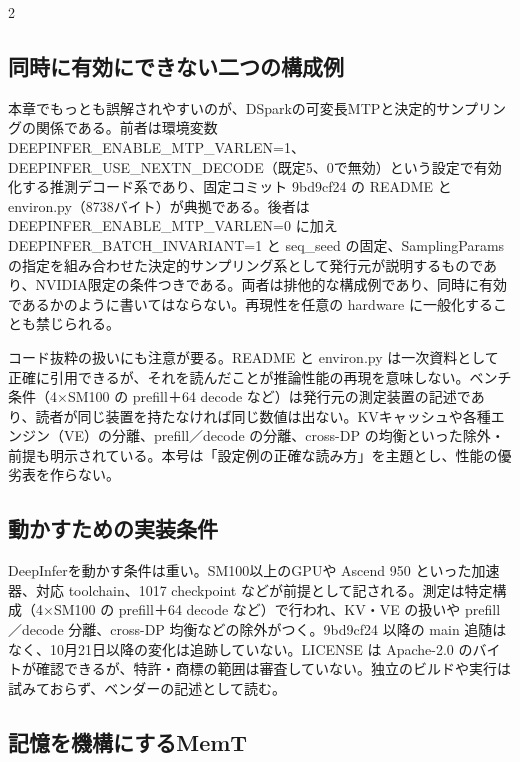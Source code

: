 \documentclass[lualatex,a4paper,10pt]{jlreq}
\begin{document}
\begin{multicols}{2} %


\subsection*{同時に有効にできない二つの構成例}


本章でもっとも誤解されやすいのが、DSparkの可変長MTPと決定的サンプリングの関係である。前者は環境変数 DEEPINFER\_ENABLE\_MTP\_VARLEN=1、DEEPINFER\_USE\_NEXTN\_DECODE（既定5、0で無効）という設定で有効化する推測デコード系であり、固定コミット 9bd9cf24 の README と environ.py（8738バイト）が典拠である。後者は DEEPINFER\_ENABLE\_MTP\_VARLEN=0 に加え DEEPINFER\_BATCH\_INVARIANT=1 と seq\_seed の固定、SamplingParams の指定を組み合わせた決定的サンプリング系として発行元が説明するものであり、NVIDIA限定の条件つきである。両者は排他的な構成例であり、同時に有効であるかのように書いてはならない。再現性を任意の hardware に一般化することも禁じられる。


コード抜粋の扱いにも注意が要る。README と environ.py は一次資料として正確に引用できるが、それを読んだことが推論性能の再現を意味しない。ベンチ条件（4×SM100 の prefill＋64 decode など）は発行元の測定装置の記述であり、読者が同じ装置を持たなければ同じ数値は出ない。KVキャッシュや各種エンジン（VE）の分離、prefill／decode の分離、cross-DP の均衡といった除外・前提も明示されている。本号は「設定例の正確な読み方」を主題とし、性能の優劣表を作らない。


\subsection*{動かすための実装条件}


DeepInferを動かす条件は重い。SM100以上のGPUや Ascend 950 といった加速器、対応 toolchain、1017 checkpoint などが前提として記される。測定は特定構成（4×SM100 の prefill＋64 decode など）で行われ、KV・VE の扱いや prefill／decode 分離、cross-DP 均衡などの除外がつく。9bd9cf24 以降の main 追随はなく、10月21日以降の変化は追跡していない。LICENSE は Apache-2.0 のバイトが確認できるが、特許・商標の範囲は審査していない。独立のビルドや実行は試みておらず、ベンダーの記述として読む。


\subsection*{記憶を機構にするMemT}



\end{multicols}
\end{document}
